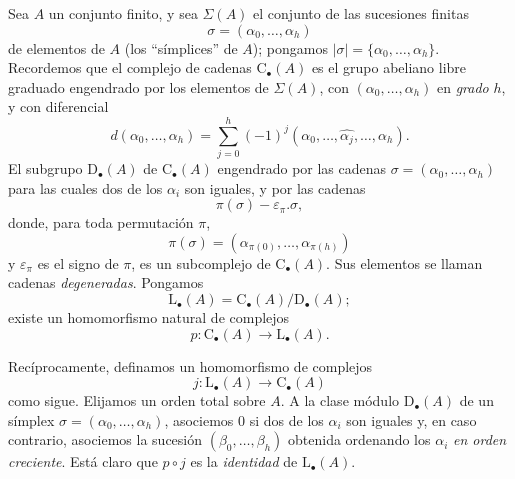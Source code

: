 \documentclass[oneside]{amsart}
\let\EGAOriginalLabel\label
\renewcommand{\label}[1]{\phantomsection\EGAOriginalLabel{#1}}
\begin{document}
\begin{env}[11.8.1]
\label{0.11.8.1}
Sea $A$ un conjunto finito, y sea $\Sigma(A)$ el conjunto de las sucesiones
finitas
\[
  \sigma=(\alpha_0,\ldots,\alpha_h)
\]
de elementos de $A$ (los ``símplices'' de $A$); pongamos
$|\sigma|=\{\alpha_0,\ldots,\alpha_h\}$.
Recordemos que el complejo de cadenas $\mathrm{C}_\bullet(A)$ es el grupo abeliano
libre graduado engendrado por los elementos de $\Sigma(A)$, con
$(\alpha_0,\ldots,\alpha_h)$ en \emph{grado} $h$, y con diferencial
\[
  d(\alpha_0,\ldots,\alpha_h)
  =
  \sum_{j=0}^{h}(-1)^j
  (\alpha_0,\ldots,\widehat{\alpha_j},\ldots,\alpha_h).
\]
El subgrupo $\mathrm{D}_\bullet(A)$ de $\mathrm{C}_\bullet(A)$ engendrado
por las cadenas $\sigma=(\alpha_0,\ldots,\alpha_h)$ para las cuales dos de los
$\alpha_i$ son iguales, y por las cadenas
\[
  \pi(\sigma)-\varepsilon_\pi.\sigma,
\]
donde, para toda permutación $\pi$,
\[
  \pi(\sigma)
  =
  (\alpha_{\pi(0)},\ldots,\alpha_{\pi(h)})
\]
y $\varepsilon_\pi$ es el signo de $\pi$, es un subcomplejo de
$\mathrm{C}_\bullet(A)$.
Sus elementos se llaman cadenas \emph{degeneradas}.
Pongamos
\[
  \mathrm{L}_\bullet(A)
  =
  \mathrm{C}_\bullet(A)/\mathrm{D}_\bullet(A);
\]
existe un homomorfismo natural de complejos
\[
  p:\mathrm{C}_\bullet(A)\longrightarrow\mathrm{L}_\bullet(A).
\]

Recíprocamente, definamos un homomorfismo de complejos
\[
  j:\mathrm{L}_\bullet(A)\longrightarrow\mathrm{C}_\bullet(A)
\]
como sigue.
Elijamos un orden total sobre $A$.
A la clase módulo $\mathrm{D}_\bullet(A)$ de un símplex
$\sigma=(\alpha_0,\ldots,\alpha_h)$, asociemos $0$ si dos de los
$\alpha_i$ son iguales y, en caso contrario, asociemos la sucesión
$(\beta_0,\ldots,\beta_h)$ obtenida ordenando los $\alpha_i$ \emph{en
orden creciente}.
Está claro que $p\circ j$ es la \emph{identidad} de
$\mathrm{L}_\bullet(A)$.
\end{env}
\end{document}
